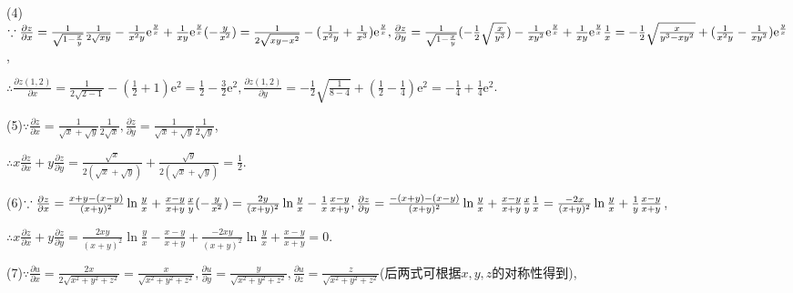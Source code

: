 \documentclass[12pt,UTF8]{ctexart}
\begin{document}
\begin{enumerate}
(4)$\because\frac{\partial z}{\partial x}=\frac1{\sqrt{1-\frac xy}}\frac1{2\sqrt{xy}}-\frac1{x^2y}\mathrm e^{\frac yx}+\frac1{xy}\mathrm e^{\frac yx}(-\frac y{x^2})=\frac 1{2\sqrt{xy-x^2}}-(\frac1{x^2y}+\frac1{x^3})\mathrm e^{\frac yx},\\
\frac{\partial z}{\partial y}=\frac1{\sqrt{1-\frac xy}}(-\frac12\sqrt{\frac x{y^3}})-\frac1{xy^2}\mathrm e^{\frac yx}+\frac1{xy}\mathrm e^{\frac yx}\frac1x=-\frac12\sqrt{\frac x{y^3-xy^2}}+(\frac1{x^2y}-\frac1{xy^2})\mathrm e^{\frac yx}$,

$\therefore\frac{\partial z(1,2)}{\partial x}=\frac1{2\sqrt{2-1}}-(\frac1{2}+1)\mathrm e^2=\frac12-\frac32\mathrm e^2,\frac{\partial z(1,2)}{\partial y}=-\frac12\sqrt{\frac1{8-4}}+(\frac12-\frac14)\mathrm e^2=-\frac14+\frac14\mathrm e^2$.

(5)$\because\frac{\partial z}{\partial x}=\frac1{\sqrt x+\sqrt y}\frac1{2\sqrt x},\frac{\partial z}{\partial y}=\frac1{\sqrt x+\sqrt y}\frac1{2\sqrt y}$,

$\therefore x\frac{\partial z}{\partial x}+y\frac{\partial z}{\partial y}=\frac{\sqrt x}{2(\sqrt x+\sqrt y)}+\frac{\sqrt y}{2(\sqrt x+\sqrt y)}=\frac12$.

(6)$\because\frac{\partial z}{\partial x}=\frac{x+y-(x-y)}{(x+y)^2}\ln\frac yx+\frac{x-y}{x+y}\frac xy(-\frac y{x^2})=\frac{2y}{(x+y)^2}\ln\frac yx-\frac1x\frac{x-y}{x+y},\\
\frac{\partial z}{\partial y}=\frac{-(x+y)-(x-y)}{(x+y)^2}\ln\frac yx+\frac{x-y}{x+y}\frac xy\frac1x=\frac{-2x}{(x+y)^2}\ln\frac yx+\frac1y\frac{x-y}{x+y}$,

$\therefore x\frac{\partial z}{\partial x}+y\frac{\partial z}{\partial y}=\frac{2xy}{(x+y)^2}\ln\frac yx-\frac{x-y}{x+y}+\frac{-2xy}{(x+y)^2}\ln\frac yx+\frac{x-y}{x+y}=0$.

(7)$\because\frac{\partial u}{\partial x}=\frac{2x}{2\sqrt{x^2+y^2+z^2}}=\frac x{\sqrt{x^2+y^2+z^2}},\frac{\partial u}{\partial y}=\frac y{\sqrt{x^2+y^2+z^2}},\frac{\partial u}{\partial z}=\frac z{\sqrt{x^2+y^2+z^2}}$(后两式可根据$x,y,z$的对称性得到),


\end{enumerate}
\end{document}
